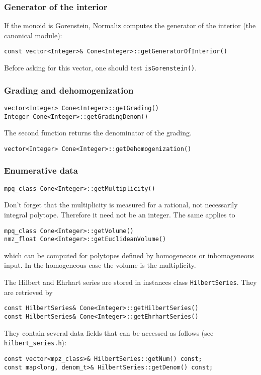 \documentclass[12pt,a4paper]{scrartcl}
\theoremstyle{definition}
\begin{document}
\begin{small}
\subsubsection{Generator of the interior}\label{GenInt}

If the monoid is Gorenstein, Normaliz computes the generator of the interior (the canonical module):
\begin{Verbatim}
const vector<Integer>& Cone<Integer>::getGeneratorOfInterior()
\end{Verbatim}
Before asking for this vector, one should test \verb|isGorenstein()|. 

\subsubsection{Grading and dehomogenization}

\begin{Verbatim}
vector<Integer> Cone<Integer>::getGrading()
Integer Cone<Integer>::getGradingDenom()
\end{Verbatim}
The second function returns the denominator of the grading.

\begin{Verbatim}
vector<Integer> Cone<Integer>::getDehomogenization()
\end{Verbatim}

\subsubsection{Enumerative data}

\begin{Verbatim}
mpq_class Cone<Integer>::getMultiplicity()
\end{Verbatim}
Don't forget that the multiplicity is measured for a rational, not necessarily integral polytope. Therefore it need not be an integer. The same applies to
\begin{Verbatim}
mpq_class Cone<Integer>::getVolume()
nmz_float Cone<Integer>::getEuclideanVolume()
\end{Verbatim}
which can be computed for polytopes defined by homogeneous or inhomogeneous input. In the homogeneous case the volume is the multiplicity.

The Hilbert and Ehrhart  series are stored in instances class \verb|HilbertSeries|. They are retrieved by
\begin{Verbatim}
const HilbertSeries& Cone<Integer>::getHilbertSeries()
const HilbertSeries& Cone<Integer>::getEhrhartSeries()
\end{Verbatim}
They contain several data fields that can be accessed as follows (see \verb|hilbert_series.h|):
\begin{Verbatim}
const vector<mpz_class>& HilbertSeries::getNum() const;
const map<long, denom_t>& HilbertSeries::getDenom() const;


\end{Verbatim}
\end{small}
\end{document}
